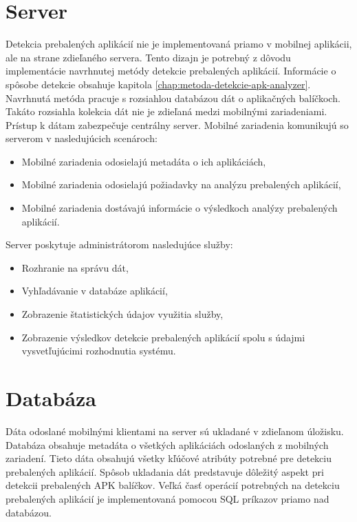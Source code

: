 \section{Server}
Detekcia prebalených aplikácií nie je implementovaná priamo v mobilnej aplikácii, ale na strane zdieľaného servera. Tento dizajn je potrebný z dôvodu implementácie navrhnutej metódy detekcie prebalených aplikácií. Informácie o spôsobe detekcie obsahuje kapitola \ref{chap:metoda-detekcie-apk-analyzer}. Navrhnutá metóda pracuje s rozsiahlou databázou dát o aplikačných balíčkoch. Takáto rozsiahla kolekcia dát nie je zdieľaná medzi mobilnými zariadeniami. Prístup k dátam zabezpečuje centrálny server. 
\newline
\noindent Mobilné zariadenia komunikujú so serverom v nasledujúcich scenároch:
\begin{itemize}
	\item Mobilné zariadenia odosielajú metadáta o ich aplikáciách,
	\item Mobilné zariadenia odosielajú požiadavky na analýzu prebalených aplikácií,
	\item Mobilné zariadenia dostávajú informácie o výsledkoch analýzy prebalených aplikácií.
\end{itemize}
Server poskytuje administrátorom nasledujúce služby:
\begin{itemize}
	\item Rozhranie na správu dát,
	\item Vyhľadávanie v databáze aplikácií,
	\item Zobrazenie štatistických údajov využitia služby,
	\item Zobrazenie výsledkov detekcie prebalených aplikácií spolu s údajmi vysvetľujúcimi rozhodnutia systému.
\end{itemize}

\section{Databáza}
Dáta odoslané mobilnými klientami na server sú ukladané v zdieľanom úložisku. Databáza obsahuje metadáta o všetkých aplikáciách odoslaných z mobilných zariadení. Tieto dáta obsahujú všetky kľúčové atribúty potrebné pre detekciu prebalených aplikácií. Spôsob ukladania dát predstavuje dôležitý aspekt pri detekcii prebalených APK balíčkov. Veľká časť operácií potrebných na detekciu prebalených aplikácií je implementovaná pomocou SQL príkazov priamo nad databázou. 